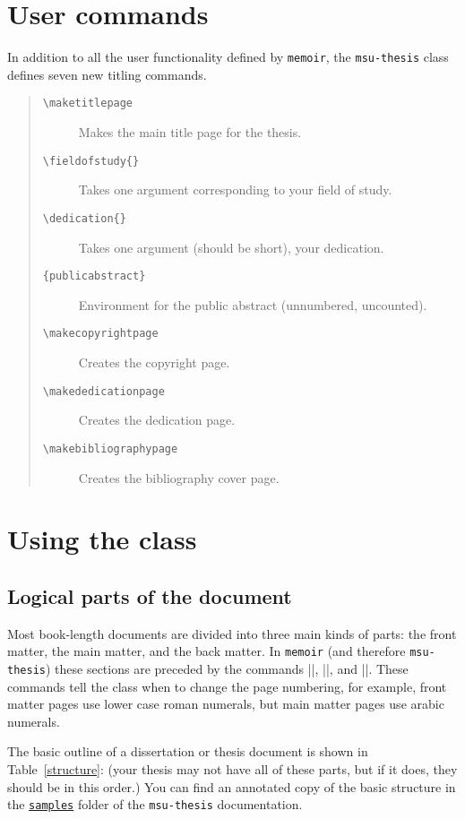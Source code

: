 \documentclass[11pt]{article}
\newcommand*\bs{\textbackslash}
\newcommand*{\pkg}[1]{\texttt{#1}\xspace}
\begin{document}
\section{User commands}
In addition to all the user functionality defined by \pkg{memoir}, the \pkg{msu-thesis} class defines seven new titling commands. 
\begin{quote}
\begin{description}
\item[\texttt{\bs maketitlepage}] Makes the main title page for the thesis.
\item[\texttt{\bs fieldofstudy\{\}}] Takes one argument corresponding to your field of study.
\item[\texttt{\bs dedication\{\}}] Takes one argument (should be short), your dedication.
\item[\texttt{\{publicabstract\}}] Environment for the public abstract (unnumbered, uncounted).
\item[\texttt{\bs makecopyrightpage}] Creates the copyright page.
\item[\texttt{\bs makededicationpage}] Creates the dedication page.
\item[\texttt{\bs makebibliographypage}] Creates the bibliography cover page.
\end{description}
\end{quote}
\section{Using the class}
\subsection{Logical parts of the document}

Most book-length documents are divided into three main kinds of parts: the front matter, the main matter, and the back matter.  In \pkg{memoir} (and therefore \pkg{msu-thesis}) these sections are preceded by the commands |\frontmatter|, |\mainmatter|, and |\backmatter|.  These commands tell the class when to change the page numbering, for example, front matter pages  use lower case roman numerals, but main matter pages use arabic numerals.

The basic outline of a dissertation or thesis document is shown in Table~\ref{structure}: (your thesis may not have all of these parts, but if it does, they should be in this order.) You can find an annotated copy of the basic structure in the \href{https://ctan.org/tex-archive/macros/latex/contrib/msu-thesis/samples}{\pkg{samples}} folder of the \pkg{msu-thesis} documentation.
\end{document}
